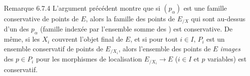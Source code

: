 \documentclass[10pt]{../fichiers-configuration-latex/smfart}
\begin{document}
\begin{enonce*}[remark]{Remarque 6.7.4}
L'argument précédent montre que si $(p_{\alpha})$ est une famille
conservative de points de $E$, alors la famille des points de
$E_{/X}$ qui sont au-dessus d'un des $p_{\alpha}$ (famille indexée
par l'ensemble somme des ) est conservative. De
même, si les $X_i$ couvrent l'objet final de $E$, et si pour tout
$i\in I$, $P_i$ est un ensemble conservatif de points de $E_{/X_i}$,
alors l'ensemble des points de $E$ \emph{images} des $p\in P_i$ pour
les morphismes de localisation $E_{/X_i}\rightarrow E$ ($i\in I$ et
$p$ variables) est conservatif.
\end{enonce*}

\setcounter{subsection}{7}
\end{document}

